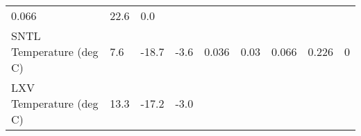 \documentclass[11pt]{article}
\begin{document}
\begin{longtable}[]{@{}lllllllll@{}}
\begin{minipage}[t]{0.06\columnwidth}
0.066\strut
\end{minipage} & \begin{minipage}[t]{0.06\columnwidth}\raggedright\strut
22.6\strut
\end{minipage} & \begin{minipage}[t]{0.07\columnwidth}\raggedright\strut
0.0\strut
\end{minipage}\tabularnewline
\begin{minipage}[t]{0.25\columnwidth}\raggedright\strut
SNTL Temperature (deg C)\strut
\end{minipage} & \begin{minipage}[t]{0.06\columnwidth}\raggedright\strut
7.6\strut
\end{minipage} & \begin{minipage}[t]{0.06\columnwidth}\raggedright\strut
-18.7\strut
\end{minipage} & \begin{minipage}[t]{0.08\columnwidth}\raggedright\strut
-3.6\strut
\end{minipage} & \begin{minipage}[t]{0.05\columnwidth}\raggedright\strut
0.036\strut
\end{minipage} & \begin{minipage}[t]{0.07\columnwidth}\raggedright\strut
0.03\strut
\end{minipage} & \begin{minipage}[t]{0.06\columnwidth}\raggedright\strut
0.066\strut
\end{minipage} & \begin{minipage}[t]{0.06\columnwidth}\raggedright\strut
0.226\strut
\end{minipage} & \begin{minipage}[t]{0.07\columnwidth}\raggedright\strut
0\strut
\end{minipage}\tabularnewline
\begin{minipage}[t]{0.25\columnwidth}\raggedright\strut
LXV Temperature (deg C)\strut
\end{minipage} & \begin{minipage}[t]{0.06\columnwidth}\raggedright\strut
13.3\strut
\end{minipage} & \begin{minipage}[t]{0.06\columnwidth}\raggedright\strut
-17.2\strut
\end{minipage} & \begin{minipage}[t]{0.08\columnwidth}\raggedright\strut
-3.0\strut
\end{minipage} & \begin{minipage}[t]{0.05\columnwidth}\raggedright\strut

\end{minipage}
\end{longtable}
\end{document}

